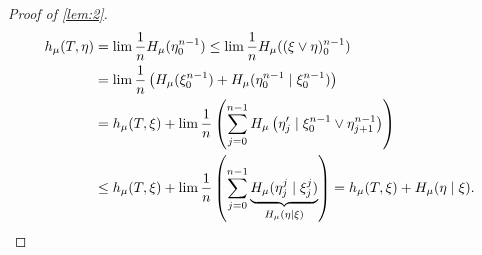 \documentclass{article}
\begin{document}
\begin{proof}[Proof of \cref{lem:2}]
  \begin{align*}
    h_\mu(T, \eta) &= \lim \frac{1}{n} H_\mu(\eta_0^{n-1}) \leq \lim \frac{1}{n} H_\mu((\xi \vee \eta)_0^{n-1})  \\
                   &= \lim \frac{1}{n} \left(H_\mu(\xi_0^{n-1}) + H_\mu(\eta_0^{n-1} \mid \xi_0^{n-1})\right) \\
                   &= h_\mu(T, \xi) + \lim \frac{1}{n} \left(\sum_{j=0}^{n-1} H_\mu\left(\eta_j' \mid \xi_0^{n-1} \vee \eta_{j+1}^{n-1}\right)\right) \\
                   &\leq h_\mu(T,\xi) + \lim \frac{1}{n} \left(\sum_{j=0}^{n-1} \underbrace{H_\mu(\eta_j^j \mid \xi_j^j)}_{H_\mu(\eta \mid \xi)}\right) = h_\mu(T,\xi) + H_\mu(\eta \mid \xi). \qedhere
  \end{align*}
\end{proof}
\end{document}
